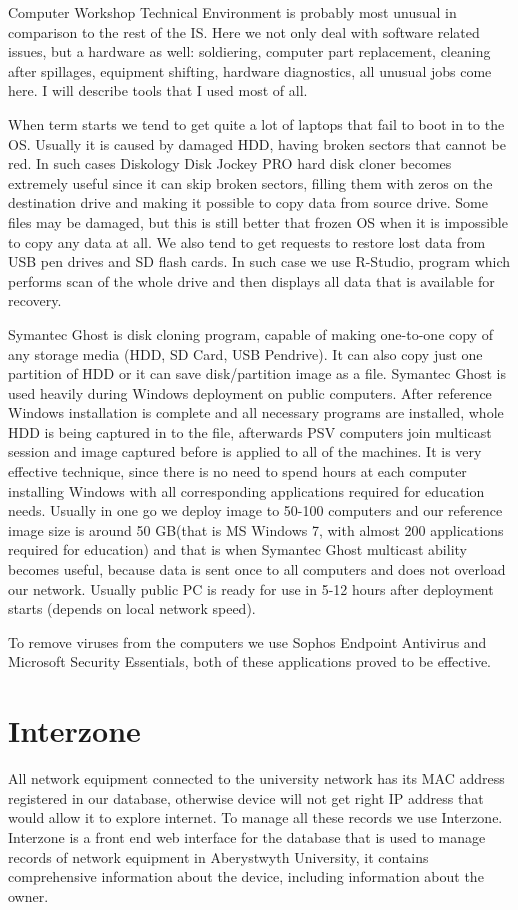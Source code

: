 \documentclass[10pt,a4paper,headinclude=true]{report}
\begin{document}
Computer Workshop Technical Environment is probably most unusual in comparison to the rest of the IS. Here we not only deal with software related issues, but a hardware as well: soldiering, computer part replacement, cleaning after spillages, equipment shifting, hardware diagnostics, all unusual jobs come here. I will describe tools that I used most of all. 

When term starts we tend to get quite a lot of laptops that fail to boot in to the OS. Usually it is caused by damaged HDD, having broken sectors that cannot be red. In such cases Diskology Disk Jockey PRO hard disk cloner\cite{DiskCloner} becomes extremely useful since it can skip broken sectors, filling them with zeros on the destination drive and making it possible to copy data from source drive. Some files may be damaged, but this is still better that frozen OS when it is impossible to copy any data at all. We also tend to get requests to restore lost data from USB pen drives and SD flash cards. In such case we use R-Studio, program which performs scan of the whole drive and then displays all data that is available for recovery. 

Symantec Ghost is disk cloning program, capable of making one-to-one copy of any storage media (HDD, SD Card, USB Pendrive). It can also copy just one partition of HDD or it can save disk/partition image as a file. Symantec Ghost is used heavily during Windows deployment on public computers. After reference Windows installation is complete and all necessary programs are installed, whole HDD is being captured in to the file, afterwards PSV computers join multicast session and image captured before is applied to all of the machines. It is very effective technique, since there is no need to spend hours at each computer installing Windows with all corresponding applications required for education needs. Usually in one go we deploy image to 50-100 computers and our reference image size is around 50 GB(that is MS Windows 7, with almost 200 applications required for education) and that is when Symantec Ghost multicast ability becomes useful, because data is sent once to all computers and does not overload our network. Usually public PC is ready for use in 5-12 hours after deployment starts (depends on local network speed).

To remove viruses from the computers we use Sophos Endpoint Antivirus and Microsoft Security Essentials, both of these applications proved to be effective.
 
\section{Interzone}
All network equipment connected to the university network has its MAC address registered in our database, otherwise device will not get right IP address that would allow it to explore internet. To manage all these records we use Interzone. 
Interzone is a front end web interface for the database that is used to manage records of network equipment in Aberystwyth University, it contains comprehensive information about the device, including information about the owner. 
\end{document}
